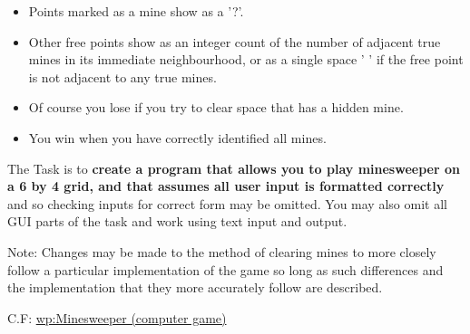 \begin{itemize}
\item
  Points marked as a mine show as a '?'.
\item
  Other free points show as an integer count of the number of adjacent
  true mines in its immediate neighbourhood, or as a single space ' ' if
  the free point is not adjacent to any true mines.
\end{itemize}

\begin{itemize}
\item
  Of course you lose if you try to clear space that has a hidden mine.
\item
  You win when you have correctly identified all mines.
\end{itemize}

The Task is to \textbf{create a program that allows you to play
minesweeper on a 6 by 4 grid, and that assumes all user input is
formatted correctly} and so checking inputs for correct form may be
omitted. You may also omit all GUI parts of the task and work using text
input and output.

Note: Changes may be made to the method of clearing mines to more
closely follow a particular implementation of the game so long as such
differences and the implementation that they more accurately follow are
described.

C.F:
\href{http://en.wikipedia.org/wiki/Minesweeper\_(computer\_game)}{wp:Minesweeper
(computer game)}



